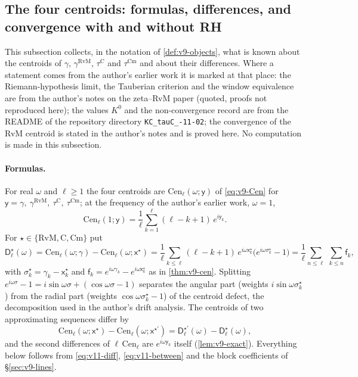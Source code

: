 \documentclass[11pt,a4paper]{article}
\numberwithin{equation}{section}
\theoremstyle{definition}
\theoremstyle{remark}
\newcommand{\Cm}{\mathrm{Cm}}
\begin{document}
\subsection{The four centroids: formulas, differences, and convergence with and without RH}\label{sec:v11-four}
This subsection collects, in the notation of \cref{def:v9-objects}, what is known about the centroids of $\gamma$, $\gamma^{\mathrm{RvM}}$, $\tau^{\mathrm C}$ and $\tau^{\Cm}$ and about their differences. Where a statement comes from the author's earlier work it is marked at that place: the Riemann-hypothesis limit, the Tauberian criterion and the window equivalence are from the author's notes on the zeta--RvM paper \cite{CasanaV26} (quoted, proofs not reproduced here); the values $K^0$ and the non-convergence record are from the README of the repository directory \texttt{KC\_\allowbreak tauC\_-11-02}; the convergence of the RvM centroid is stated in the author's notes and is proved here. No computation is made in this subsection.

\paragraph{Formulas.} For real $\omega$ and $\ell\ge1$ the four centroids are $\mathrm{Cen}_\ell(\omega;\mathsf y)$ of \eqref{eq:v9-Cen} for $\mathsf y=\gamma,\ \gamma^{\mathrm{RvM}},\ \tau^{\mathrm C},\ \tau^{\Cm}$; at the frequency of the author's earlier work, $\omega=1$,
\begin{equation}
\mathrm{Cen}_\ell(1;\mathsf y)=\frac1\ell\sum_{k=1}^{\ell}(\ell-k+1)\,e^{i\mathsf y_k}.
\end{equation}
For $\star\in\{\mathrm{RvM},\mathrm C,\Cm\}$ put
\begin{equation}\label{eq:v11-diff}
\mathsf D_\ell^\star(\omega)=\mathrm{Cen}_\ell(\omega;\gamma)-\mathrm{Cen}_\ell(\omega;\mathsf x^\star)
=\frac1\ell\sum_{k\le\ell}(\ell-k+1)\,e^{i\omega\mathsf x_k^\star}\bigl(e^{i\omega\sigma_k^\star}-1\bigr)
=\frac1\ell\sum_{n\le\ell}\ \sum_{k\le n}\mathsf f_k ,
\end{equation}
with $\sigma_k^\star=\gamma_k-\mathsf x_k^\star$ and $\mathsf f_k=e^{i\omega\gamma_k}-e^{i\omega\mathsf x_k^\star}$ as in \cref{thm:v9-cen}. Splitting $e^{i\omega\sigma}-1=i\sin\omega\sigma+(\cos\omega\sigma-1)$ separates the angular part (weights $i\sin\omega\sigma_k^\star$) from the radial part (weights $\cos\omega\sigma_k^\star-1$) of the centroid defect, the decomposition used in the author's drift analysis. The centroids of two approximating sequences differ by
\begin{equation}\label{eq:v11-between}
\mathrm{Cen}_\ell(\omega;\mathsf x^{\star})-\mathrm{Cen}_\ell(\omega;\mathsf x^{\star'})=\mathsf D_\ell^{\star'}(\omega)-\mathsf D_\ell^{\star}(\omega),
\end{equation}
and the second differences of $\ell\,\mathrm{Cen}_\ell$ are $e^{i\omega\mathsf y_k}$ itself (\cref{lem:v9-exact}). Everything below follows from \eqref{eq:v11-diff}, \eqref{eq:v11-between} and the block coefficients of \S\ref{sec:v9-lines}.
\end{document}
